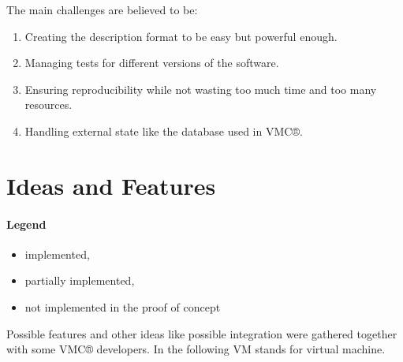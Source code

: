 \documentclass[a4paper,twocolumn,twoside]{article}
\newcommand{\VMC}[0]{VMC®}
\newcommand{\notImplemented}[0]{\item[$\times$] }
\newcommand{\partiallyImplemented}[0]{\item[$\boxdot$] }
\newcommand{\implemented}[0]{\item[\checkmark] }
\begin{document}

The main challenges are believed to be:
\begin{enumerate}
	\item Creating the description format to be easy but powerful enough.
	\item Managing tests for different versions of the software.
	\item Ensuring reproducibility while not wasting too much time and too many resources.
	\item Handling external state like the database used in \VMC{}.
\end{enumerate}


\section{Ideas and Features}
\paragraph{Legend}
\begin{itemize}
	\implemented implemented,
	\partiallyImplemented partially implemented,
	\notImplemented not implemented in the proof of concept
\end{itemize}
	
	Possible features and other ideas like possible integration were gathered together with some \VMC{} developers.
	In the following VM stands for virtual machine.
	
\end{document}
